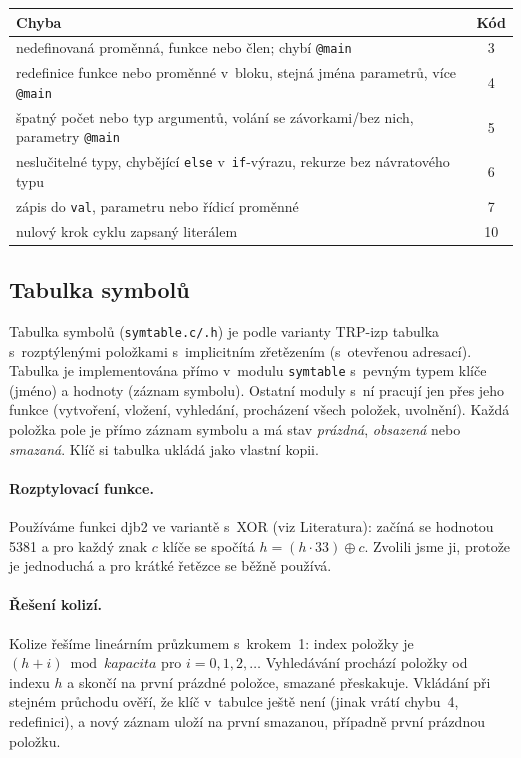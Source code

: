 \documentclass[11pt,a4paper]{article}
\begin{document}
\begin{center}
\small
\begin{tabular}{@{}lc@{}}
\toprule
Chyba & Kód \\
\midrule
nedefinovaná proměnná, funkce nebo člen; chybí \texttt{@main} & 3 \\
redefinice funkce nebo proměnné v~bloku, stejná jména parametrů,
  více \texttt{@main} & 4 \\
špatný počet nebo typ argumentů, volání se závorkami/bez nich,
  parametry \texttt{@main} & 5 \\
neslučitelné typy, chybějící \texttt{else} v~\texttt{if}-výrazu,
  rekurze bez návratového typu & 6 \\
zápis do \texttt{val}, parametru nebo řídicí proměnné & 7 \\
nulový krok cyklu zapsaný literálem & 10 \\
\bottomrule
\end{tabular}
\end{center}
\subsection{Tabulka symbolů}\label{sec:symtable}
Tabulka symbolů (\texttt{symtable.c/.h}) je podle varianty TRP-izp
tabulka s~rozptýlenými položkami s~implicitním zřetězením (s~otevřenou
adresací). Tabulka je implementována přímo v~modulu \texttt{symtable}
s~pevným typem klíče (jméno) a hodnoty (záznam symbolu). Ostatní moduly
s~ní pracují jen přes jeho funkce (vytvoření, vložení, vyhledání,
procházení všech položek, uvolnění). Každá položka pole je přímo záznam
symbolu a má stav \emph{prázdná}, \emph{obsazená} nebo \emph{smazaná}.
Klíč si tabulka ukládá jako vlastní kopii.

\paragraph{Rozptylovací funkce.}
Používáme funkci djb2 ve variantě s~XOR (viz Literatura): začíná se hodnotou 5381
a pro každý znak $c$ klíče se spočítá $h = (h \cdot 33) \oplus c$.
Zvolili jsme ji, protože je jednoduchá a pro krátké řetězce se běžně používá.

\paragraph{Řešení kolizí.}
Kolize řešíme lineárním průzkumem s~krokem~1: index položky je
$(h + i) \bmod \mathit{kapacita}$ pro $i = 0, 1, 2, \dots$
Vyhledávání prochází položky od indexu $h$ a skončí na první prázdné
položce, smazané přeskakuje. Vkládání při stejném průchodu ověří, že klíč
v~tabulce ještě není (jinak vrátí chybu~4, redefinici), a nový záznam
uloží na první smazanou, případně první prázdnou položku.
\end{document}
